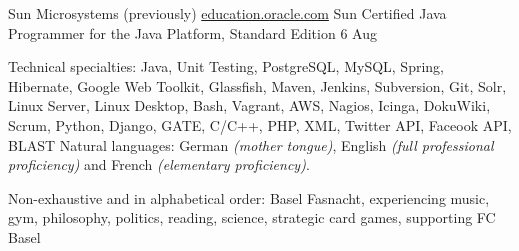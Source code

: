 \documentclass[10pt,a4paper]{article}
\begin{document}
\headedsection
  {Sun Microsystems (previously)}
  {\href{http://education.oracle.com/}{education.oracle.com}} {%
  \headedsubsection
    {Sun Certified Java Programmer for the Java Platform, Standard Edition 6}
    {Aug }
    {\bodytext{}}
}

\spacedhrule{0.5em}{-0.4em}


\inlineheadsection  %
  {Technical specialties:}
  {Java, Unit Testing, PostgreSQL, MySQL, Spring, Hibernate, Google Web Toolkit, Glassfish, Maven, Jenkins, Subversion, Git, Solr, Linux Server, Linux Desktop, Bash, Vagrant, AWS, Nagios, Icinga, DokuWiki, Scrum, Python, Django, GATE, C/C++, PHP, XML, Twitter API, Faceook API, BLAST}
\inlineheadsection
  {Natural languages:}
  {German \emph{(mother tongue)}, English \emph{(full professional proficiency)} and French \emph{(elementary proficiency)}.}

\spacedhrule{1.6em}{-0.4em}


\inlineheadsection
  {Non-exhaustive and in alphabetical order:}
  {Basel Fasnacht, experiencing music, gym, philosophy, politics, reading, science, strategic card games, supporting FC Basel}
\end{document}
